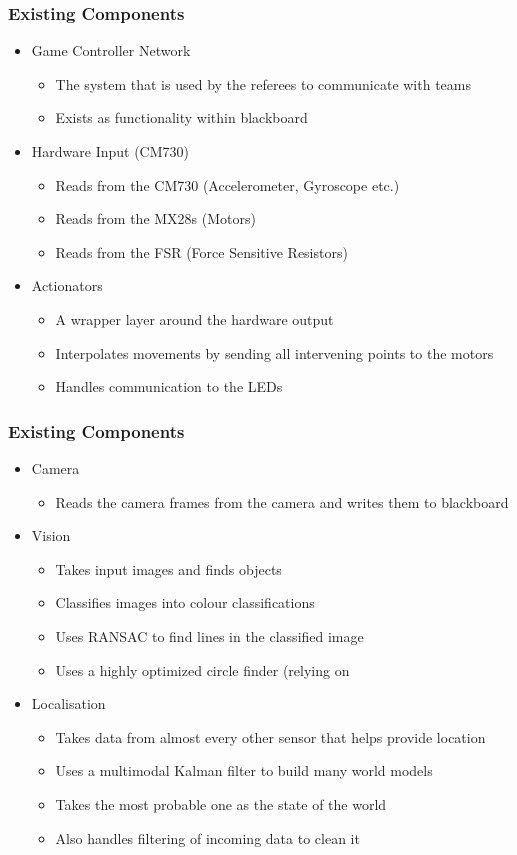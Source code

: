 \documentclass{beamer}
\begin{document}
\begin{frame}
	\frametitle{Existing Components}
	\begin{itemize}
		\item Game Controller Network
			\begin{itemize}
				\item The system that is used by the referees to communicate with teams
				\item Exists as functionality within blackboard
			\end{itemize}
		\item Hardware Input (CM730)
			\begin{itemize}
				\item Reads from the CM730 (Accelerometer, Gyroscope etc.)
				\item Reads from the MX28s (Motors)
				\item Reads from the FSR (Force Sensitive Resistors)
			\end{itemize}
		\item Actionators
			\begin{itemize}
				\item A wrapper layer around the hardware output
				\item Interpolates movements by sending all intervening points to the motors
				\item Handles communication to the LEDs
			\end{itemize}
	\end{itemize}
\end{frame}

\begin{frame}
	\frametitle{Existing Components}
	\begin{itemize}
		\item Camera
			\begin{itemize}
				\item Reads the camera frames from the camera and writes them to blackboard
			\end{itemize}
		\item Vision
			\begin{itemize}
				\item Takes input images and finds objects
				\item Classifies images into colour classifications
				\item Uses RANSAC to find lines in the classified image
				\item Uses a highly optimized circle finder (relying on
			\end{itemize}
		\item Localisation
			\begin{itemize}
				\item Takes data from almost every other sensor that helps provide location
				\item Uses a multimodal Kalman filter to build many world models
				\item Takes the most probable one as the state of the world
				\item Also handles filtering of incoming data to clean it
			\end{itemize}
	\end{itemize}
\end{frame}
\end{document}
